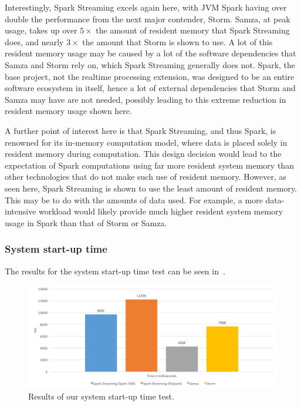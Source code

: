 Interestingly, Spark Streaming excels again here, with JVM Spark having over double the performance from the next major
contender, Storm. Samza, at peak usage, takes up over $5\times$ the amount of resident memory that Spark Streaming does, and
nearly $3\times$ the amount that Storm is shown to use. A lot of this resident memory usage may be caused by a lot of the
software dependencies that Samza and Storm rely on, which Spark Streaming generally does not. Spark, the base project,
not the realtime processing extension, was designed to be an entire software ecosystem in itself, hence a lot of external
dependencies that Storm and Samza may have are not needed, possibly leading to this extreme reduction in resident memory
usage shown here.

A further point of interest here is that Spark Streaming, and thus Spark, is renowned for its in-memory computation model,
where data is placed solely in resident memory during computation. This design decision would lead to the expectation of
Spark computations using far more resident system memory than other technologies that do not make such use of resident memory.
However, as seen here, Spark Streaming is shown to use the least amount of resident memory. This may be to do with the
amounts of data used. For example, a more data-intensive workload would likely provide much higher resident system memory
usage in Spark than that of Storm or Samza.

\subsubsection{System start-up time}

The results for the system start-up time test can be seen in~.

\begin{figure}[ht]
  \centering
  \includegraphics[width=1\textwidth]{includes/figures/fig_startup_time_res}
  \caption{Results of our system start-up time test.}
  \label{fig:startup_time}
\end{figure}

